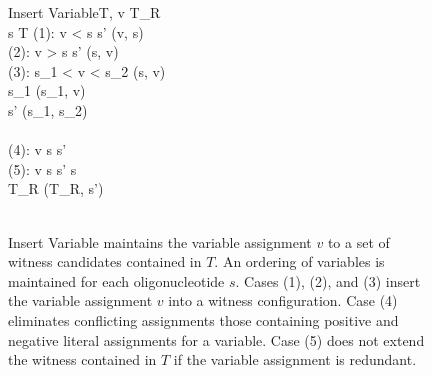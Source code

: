

\begin{figure}[htbp]
\begin{center}

	\begin{pseudocode}{Insert Variable}{T, v}
		T_R \GETS \emptyset \\
		\FOREACH {} s  T \DO
			\BEGIN
				\CASE(1): v < s \THEN
					s' \GETS {}(v, s)\\
				\CASE(2): v > s \THEN
					s' \GETS {}(s, v)\\
				\CASE(3): s_1 < v < s_2 \THEN
					\BEGIN
					[s_1, s_2] \GETS {}(s, v)\\
					s_1 \GETS {}(s_1, v)\\
					s' \GETS {}(s_1, s_2)\\
					\END \\
				\CASE(4): \neg v \in s \THEN
					s' \GETS \emptyset \\
				\CASE(5): v \in s \THEN
					s' \GETS s\\
				T_R \GETS {}(T_R, s') \\
			\END \\
	\end{pseudocode}

\caption{{\sc Insert Variable} maintains the variable assignment $v$ to a set of witness candidates contained in $T$.  An ordering of variables is maintained for each oligonucleotide $s$.  Cases (1), (2), and (3) insert the variable assignment $v$ into a witness configuration.  Case (4) eliminates conflicting assignments those containing positive and negative literal assignments for a variable.  Case (5) does not extend the witness contained in $T$ if the variable assignment is redundant.}
\label{insertVariableAlgorithm}
\end{center}
\end{figure}


